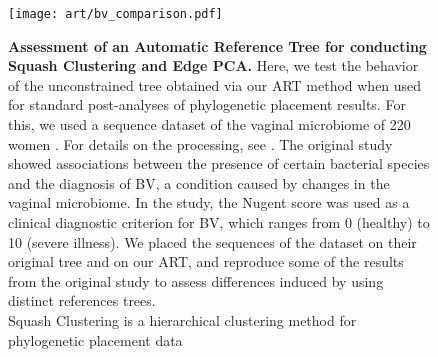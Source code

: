 \begin{figure}[hpbt]
    \centering
    \texttt{[image: art/bv\_comparison.pdf]}
    \vspace*{-1em}
    \begin{subfigure}{0pt}
        \label{fig:bv_comparison:sub:squash_art}
    \end{subfigure}
    \begin{subfigure}{0pt}
        \label{fig:bv_comparison:sub:squash_orig}
    \end{subfigure}
    \begin{subfigure}{0pt}
        \label{fig:bv_comparison:sub:edgepca_art}
    \end{subfigure}
    \begin{subfigure}{0pt}
        \label{fig:bv_comparison:sub:edgepca_orig}
    \end{subfigure}
    \caption[Assessment of an Automatic Reference Tree for conducting Squash Clustering and Edge PCA]{
        \small
        \textbf{Assessment of an Automatic Reference Tree for conducting Squash Clustering and Edge PCA.}
        Here, we test the behavior of the unconstrained  tree obtained via our \ac{ART} method
        when used for standard post-analyses of phylogenetic placement results.
        For this, we used a sequence dataset of the vaginal microbiome of 220 women \citep{Srinivasan2012}.
        For details on the processing, see .
        The original study showed associations between the presence of certain bacterial species
        and the diagnosis of \acf{BV}, a condition caused by changes in the vaginal microbiome.
        In the study, the Nugent score \citep{Nugent1991} was used as a clinical diagnostic criterion for \ac{BV},
        which ranges from \num{0} (healthy) to \num{10} (severe illness).
        We placed the sequences of the dataset on their original tree and on our \ac{ART},
        and reproduce some of the results from the original study
        to assess differences induced by using distinct references trees.
        \\
        Squash Clustering is a hierarchical clustering method for phylogenetic placement data \citep{Matsen2011a} %
}
\end{figure}
